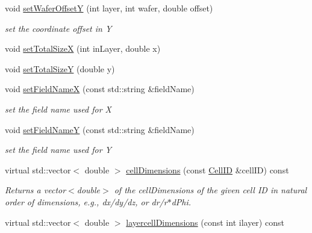 \begin{DoxyCompactItemize}
void \hyperlink{class_d_d4hep_1_1_d_d_segmentation_1_1_megatile_layer_grid_x_y_a4c17519c8f2abe47ea3b2a6d534871fa}{setWaferOffsetY} (int layer, int wafer, double offset)
\begin{DoxyCompactList}\small\item\em set the coordinate offset in Y \item\end{DoxyCompactList}\item 
void \hyperlink{class_d_d4hep_1_1_d_d_segmentation_1_1_megatile_layer_grid_x_y_a280c3a98334f9c11ceb580d27b03bf70}{setTotalSizeX} (int inLayer, double x)
\item 
void \hyperlink{class_d_d4hep_1_1_d_d_segmentation_1_1_megatile_layer_grid_x_y_ae87f5055295fe08dc28352c996bd9a0f}{setTotalSizeY} (double y)
\item 
void \hyperlink{class_d_d4hep_1_1_d_d_segmentation_1_1_megatile_layer_grid_x_y_a3f1b9a1540d75d71d29df2c0b40da730}{setFieldNameX} (const std::string \&fieldName)
\begin{DoxyCompactList}\small\item\em set the field name used for X \item\end{DoxyCompactList}\item 
void \hyperlink{class_d_d4hep_1_1_d_d_segmentation_1_1_megatile_layer_grid_x_y_a19e5ddea2f004ff1b991f16cff99648b}{setFieldNameY} (const std::string \&fieldName)
\begin{DoxyCompactList}\small\item\em set the field name used for Y \item\end{DoxyCompactList}\item 
virtual std::vector$<$ double $>$ \hyperlink{class_d_d4hep_1_1_d_d_segmentation_1_1_megatile_layer_grid_x_y_a43b169f4cb6546098e427c6d43db66cf}{cellDimensions} (const \hyperlink{namespace_d_d4hep_1_1_d_d_segmentation_ac7af071d85cb48820914434a07e21ba1}{CellID} \&cellID) const 
\begin{DoxyCompactList}\small\item\em Returns a vector$<$double$>$ of the cellDimensions of the given cell ID in natural order of dimensions, e.g., dx/dy/dz, or dr/r$\ast$dPhi. \item\end{DoxyCompactList}\item 
virtual std::vector$<$ double $>$ \hyperlink{class_d_d4hep_1_1_d_d_segmentation_1_1_megatile_layer_grid_x_y_a78ab4055a7a8959b8b36fb243b3f83a3}{layercellDimensions} (const int ilayer) const 
\end{DoxyCompactItemize}
